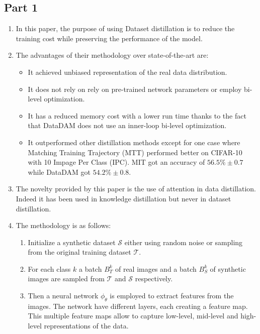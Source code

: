 \documentclass[onecolumn]{IEEEtran}
\begin{document}
\subsection{Part 1}
\begin{enumerate}[label=(\alph*)]
    \item In this paper, the purpose of using Dataset distillation is to reduce the training cost while preserving the performance of the model.
    \vspace{3mm}
    \item The advantages of their methodology over state-of-the-art are:
    \begin{itemize}
        \item It achieved unbiased representation of the real data distribution.
        \item It does not rely on rely on pre-trained network parameters or employ bi-level optimization.
        \item It has a reduced memory cost with a lower run time thanks to the fact that DataDAM does not use an inner-loop bi-level optimization.
        \item It outperformed other distillation methods except for one case where Matching Training Trajectory (MTT) performed better on CIFAR-10 with 10 Impage Per Class (IPC). MIT got an accuracy of $56.5\% \pm 0.7$ while DataDAM got $54.2\% \pm 0.8$.
    \end{itemize}
    \vspace{3mm}
    \item The novelty provided by this paper is the use of attention in data distillation. Indeed it has been used in knowledge distillation but never in dataset distillation.
    \vspace{3mm}
    \item The methodology is as follows:
    \begin{enumerate}[label=(\arabic*)]
        \item Initialize a synthetic dataset $\mathcal{S}$ either using random noise or sampling from the original training dataset $\mathcal{T}$.
        \item For each class $k$ a batch $B_T^k$ of real images and a batch $B_S^k$ of synthetic images are sampled from $\mathcal{T}$ and $\mathcal{S}$ respectively.
        \item Then a neural network $\phi_\theta$ is employed to extract features from the images. The network have different layers, each creating a feature map. This multiple feature maps allow to capture low-level, mid-level and high-level representations of the data.

\end{enumerate}
\end{enumerate}
\end{document}
